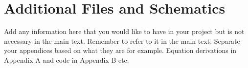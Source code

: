 \chapter{Additional Files and Schematics}
\label{ch_appendixa}

Add any information here that you would like to have in your project but is not necessary in the main
text. Remember to refer to it in the main text. Separate your appendices based on what they are for
example. Equation derivations in Appendix A and code in Appendix B etc.
